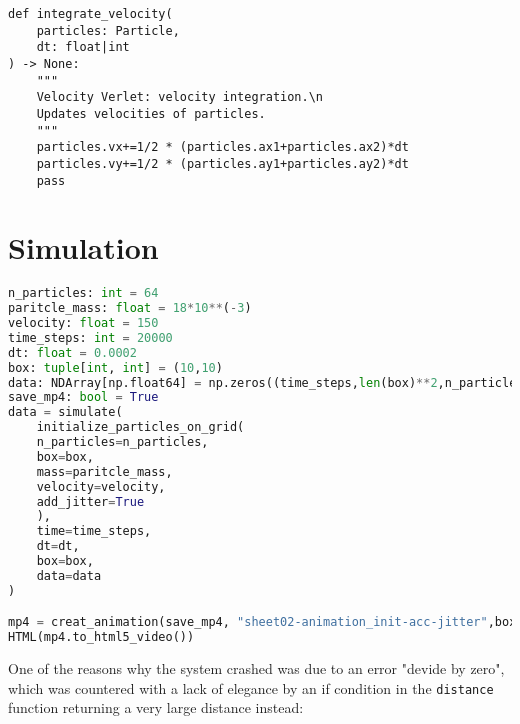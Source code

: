 \documentclass{article}
\begin{document}
\begin{lstlisting}
def integrate_velocity(
    particles: Particle,
    dt: float|int
) -> None:
    """
    Velocity Verlet: velocity integration.\n
    Updates velocities of particles.
    """
    particles.vx+=1/2 * (particles.ax1+particles.ax2)*dt
    particles.vy+=1/2 * (particles.ay1+particles.ay2)*dt
    pass
\end{lstlisting}


\section{Simulation}


\begin{lstlisting}[language=Python, caption=Simulation run.]
n_particles: int = 64  
paritcle_mass: float = 18*10**(-3)  
velocity: float = 150 
time_steps: int = 20000
dt: float = 0.0002  
box: tuple[int, int] = (10,10)  
data: NDArray[np.float64] = np.zeros((time_steps,len(box)**2,n_particles)) 
save_mp4: bool = True
data = simulate(
    initialize_particles_on_grid(
    n_particles=n_particles,
    box=box,
    mass=paritcle_mass,  
    velocity=velocity,
    add_jitter=True  
    ),
    time=time_steps, 
    dt=dt,  
    box=box,
    data=data  
)

mp4 = creat_animation(save_mp4, "sheet02-animation_init-acc-jitter",box, data[:,0,:],data[:,1,:])  
HTML(mp4.to_html5_video())   
\end{lstlisting} 
One of the reasons why the system crashed was due to an error  "devide by zero", which was countered with a lack of elegance by an if condition in the \texttt{distance} function returning a very large distance instead:
\end{document}
